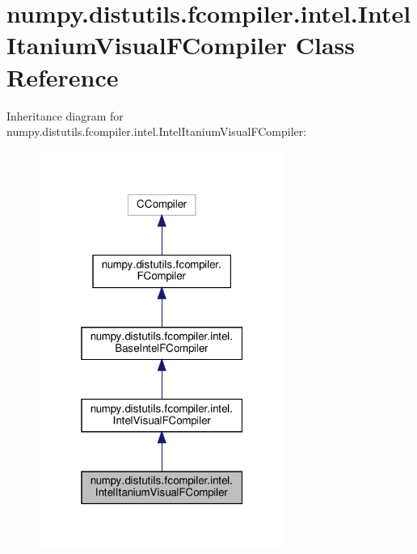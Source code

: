 \hypertarget{classnumpy_1_1distutils_1_1fcompiler_1_1intel_1_1IntelItaniumVisualFCompiler}{}\section{numpy.\+distutils.\+fcompiler.\+intel.\+Intel\+Itanium\+Visual\+F\+Compiler Class Reference}
\label{classnumpy_1_1distutils_1_1fcompiler_1_1intel_1_1IntelItaniumVisualFCompiler}


Inheritance diagram for numpy.\+distutils.\+fcompiler.\+intel.\+Intel\+Itanium\+Visual\+F\+Compiler\+:
\nopagebreak
\begin{figure}[H]
\begin{center}
\leavevmode
\includegraphics[width=229pt]{classnumpy_1_1distutils_1_1fcompiler_1_1intel_1_1IntelItaniumVisualFCompiler__inherit__graph}
\end{center}
\end{figure}



